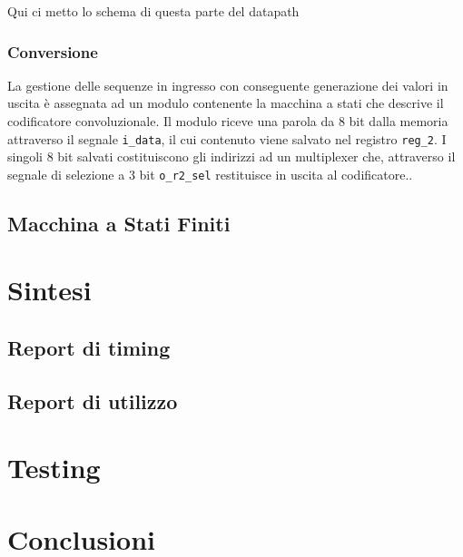 \documentclass[a4paper]{article}
\begin{document}
Qui ci metto lo schema di questa parte del datapath
\newline

\subsubsection{Conversione}
La gestione delle sequenze in ingresso con conseguente generazione dei valori in uscita è assegnata ad un modulo contenente la macchina a stati che descrive il codificatore convoluzionale. Il modulo riceve una parola da 8 bit dalla memoria attraverso il segnale \texttt{i\_data}, il cui contenuto viene salvato nel registro \texttt{reg\_2}. I singoli 8 bit salvati costituiscono gli indirizzi ad un multiplexer che, attraverso il segnale di selezione a 3 bit \texttt{o\_r2\_sel} restituisce in uscita al codificatore..

\subsection{Macchina a Stati Finiti}

\newpage
\section{Sintesi}
\subsection{Report di timing}
\subsection{Report di utilizzo}

\newpage
\section{Testing}

\newpage
\section{Conclusioni}


\newpage
\end{document}
